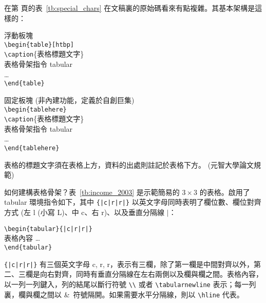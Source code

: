 在第 \pageref{tb:special_chars} 頁的表~\ref{tb:special_chars} 在文稿裏的原始碼看來有點複雜。其基本架構是這樣的：
	\begin{center}
	\begin{fmpage}{0.3\columnwidth}
		浮動板塊\\
		\verb+\begin{table}[htbp]+\\
		\verb+\caption+\{表格標題文字\}\\
		表格骨架指令 tabular\\
		\dots\\
		\verb+\end{table}+
	\end{fmpage}
 	\hspace{3em} %
	\begin{fmpage}{0.5\columnwidth}
		固定板塊 (非內建功能，定義於自創巨集)\\
		\verb+\begin{tablehere}+\\
		\verb+\caption+\{表格標題文字\}\\
		表格骨架指令 tabular\\
		\dots\\
		\verb+\end{tablehere}+
	\end{fmpage}
	\end{center}
表格的標題文字須在表格上方，資料的出處則註記於表格下方。 (元智大學論文規範)

如何建構表格骨架？表~\ref{tb:income_2003} 是示範簡易的 $3\times3$ 的表格。啟用了 tabular 環境指令如下，其中 \verb+{|c|r|r|}+ 以英文字母同時表明了欄位數、欄位對齊方式 (左  l (小寫 L)、中 c、右 r)、以及垂直分隔線 $|$：
	\begin{center}
	\begin{fmpage}{0.5\columnwidth}
		\verb+\begin{tabular}{|c|r|r|}+\\
		表格內容 \ldots\\
		\verb+\end{tabular}+
	\end{fmpage}
	\end{center}
%
\verb+{|c|r|r|}+ 有三個英文字母 c, r, r，表示有三欄，除了第一欄是中間對齊以外，第二、三欄是向右對齊，同時有垂直分隔線在左右兩側以及欄與欄之間。表格內容，以一列一列鍵入，列的結尾以斷行符號 \verb+\\+ 或者 \verb+\tabularnewline+ 表示；每一列裏，欄與欄之間以 \&\ 符號隔開。如果需要水平分隔線，則以 \verb+\hline+ 代表。

